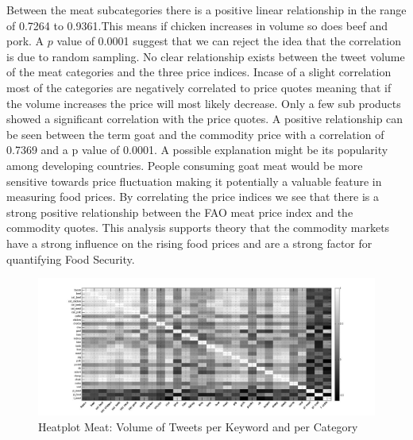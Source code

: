 Between the meat subcategories there is a  positive linear relationship in the range of 0.7264 to 0.9361.This means if chicken increases in volume so does beef and pork. A $p$ value of 0.0001 suggest that we can reject the idea that the correlation is due to random sampling. No clear relationship exists between the tweet volume of the meat categories and the three price indices. Incase of a slight correlation most of the categories are negatively correlated to price quotes meaning that if the volume increases the price will most likely decrease. Only a few sub products showed a significant correlation with the price quotes. A positive relationship can be seen between the term goat and the commodity price with a correlation of 0.7369 and a p value of 0.0001. A possible explanation might be its popularity among developing countries. People consuming goat meat would be more sensitive towards price fluctuation making it potentially a valuable feature in measuring food prices. By correlating the price indices we see that there is a strong positive relationship between the FAO meat price index and the commodity quotes. This analysis supports \cite{abbott2009} theory that the commodity markets have a strong influence on the rising food prices and are a strong factor for quantifying Food Security. 



\begin{figure}[H]
        \centering
         \includegraphics[width=1\textwidth ]{img/anal/meat_black}
              
        \caption{Heatplot Meat: Volume of Tweets per Keyword and per Category}
        \label{fig:distribution}
\end{figure}



